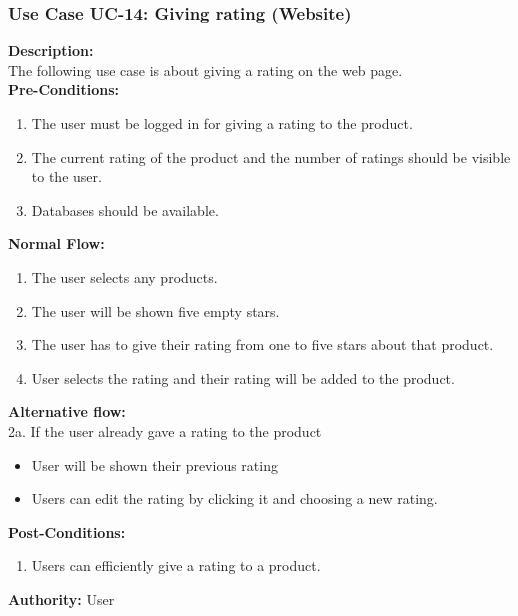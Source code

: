 \subsubsection{Use Case UC-14: Giving rating (Website) }
\textbf{Description:}\\
The following use case is about giving a rating on the web page. 
\\
\textbf{Pre-Conditions:}
\begin{enumerate}
    \item The user must be logged in for giving a rating to the product.
\item The current rating of the product and the number of ratings should be visible to the user.
\item Databases should be available. 
\end{enumerate}
\textbf{Normal Flow:}\\
\begin{enumerate}
\item The user selects any products. 
\item The user will be shown five empty stars.
\item The user has to give their rating from one to five stars about that product.
\item User selects the rating and their rating will be added to the product. 
\end{enumerate}
\textbf{Alternative flow: }\\
2a. If the user already gave a rating to the product
\begin{itemize}
    \item User will be shown their previous rating
     \item Users can edit the rating by clicking it and choosing a new rating.
\end{itemize}
\textbf{Post-Conditions: }
\begin{enumerate}
\item	Users can efficiently give a rating to a product.
\end{enumerate}
\textbf{Authority:}
User
   
